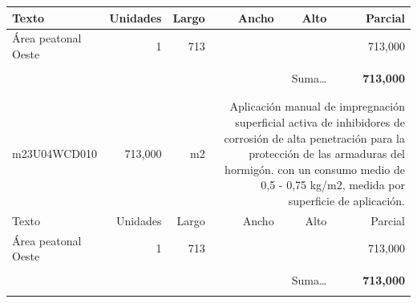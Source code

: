 \documentclass{book}%
\begin{document}
\begin{longtable}{lrrrrr}
Texto&Unidades&Largo&Ancho&Alto&Parcial\\%
\hline%
\multicolumn{1}{p{3.5cm}}{Área peatonal Oeste}&1&713&&&   713,000\\%
&&&&&\\%
\multicolumn{5}{r}{Suma\ldots}&\textbf{   713,000}\\%
\hline%
&&&&&\\%
&&&&&\\%
m23U04WCD010&   713,000& m2&\multicolumn{3}{p{6cm}}{\scriptsize Aplicación manual de impregnación superficial activa de inhibidores de corrosión de alta penetración para la protección de las armaduras del hormigón. con un consumo medio de 0,5 - 0,75 kg/m2, medida por superficie de aplicación.\normalsize}\\%
Texto&Unidades&Largo&Ancho&Alto&Parcial\\%
\hline%
\multicolumn{1}{p{3.5cm}}{Área peatonal Oeste}&1&713&&&   713,000\\%
&&&&&\\%
\multicolumn{5}{r}{Suma\ldots}&\textbf{   713,000}\\%
\hline%
&&&&&\\%
\end{longtable}%
\newpage

%
\end{document}
